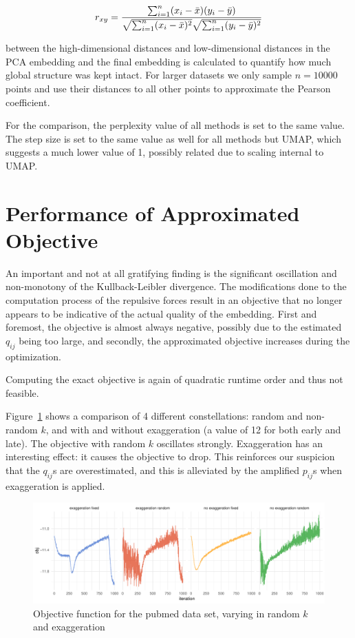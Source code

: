 \begin{equation}
  r_{xy} = \frac{\sum_{i = 1}^{n} (x_i - \bar{x})(y_i - \bar{y})}{\sqrt{\sum_{i=1}^{n}(x_i - \bar{x})^2} \sqrt{\sum_{i=1}^{n} (y_i - \bar{y})^2}} \\
\end{equation}

between the high-dimensional distances and low-dimensional distances in the PCA
embedding and the final embedding is calculated to quantify how much global structure
was kept intact. For larger datasets we only sample $n =
\num{10000}$ points and use their distances to all other points to approximate
the Pearson coefficient.

For the comparison, the perplexity value of all methods is set to the same
value.  The step size is set to the same value as well for all methods but UMAP,
which suggests a much lower value of 1, possibly related due to scaling
internal to UMAP.

\section{Performance of Approximated Objective}

An important and not at all gratifying finding is the significant oscillation
and non-monotony of the Kullback-Leibler divergence. The modifications done to
the computation process of the repulsive forces result in an objective that no
longer appears to be indicative of the actual quality of the embedding. First and
foremost, the objective is almost always negative, possibly due to the estimated $q_{ij}$
being too large, and secondly, the approximated objective increases during the optimization.

Computing the exact objective is again of quadratic runtime order and thus not feasible.

Figure~\ref{fig:obj-comp} shows a comparison of 4 different constellations: random and non-random
$k$, and with and without exaggeration (a value of 12 for both early and late). The objective
with random $k$ oscillates strongly. Exaggeration has an interesting effect: it causes the
objective to drop. This reinforces our suspicion that the $q_{ij}$s are overestimated,
and this is alleviated by the amplified $p_{ij}$s when exaggeration is applied.

\begin{figure}[tb]
  \centering
  \includegraphics[width=\linewidth]{img/obj_comp}
  \caption{Objective function for the pubmed data set, varying in random $k$ and exaggeration}
  \label{fig:obj-comp}
\end{figure}

